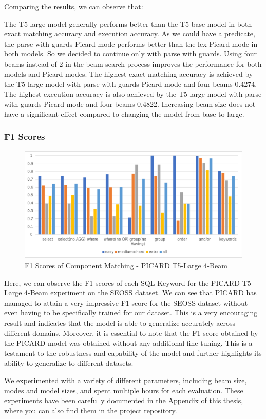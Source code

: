 Comparing the results, we can observe that:

The T5-large model generally performs better than the T5-base model in both exact matching accuracy and execution accuracy.
As we could have a predicate, the parse with guards Picard mode performs better than the lex Picard mode in both models. So we decided to continue only with parse with guards.
Using four beams instead of 2 in the beam search process improves the performance for both models and Picard modes.
The highest exact matching accuracy is achieved by the T5-large model with parse with guards Picard mode and four beams 0.4274.
The highest execution accuracy is also achieved by the T5-large model with parse with guards Picard mode and four beams 0.4822.
Increasing beam size does not have a significant effect compared to changing the model from base to large.
\subsubsection*{F1 Scores}

\begin{figure}[H]
    \centering
    \includegraphics[width=1\textwidth]{pics/ez/F1eps}
    \caption{F1 Scores of Component Matching - PICARD T5-Large 4-Beam}
\end{figure}

Here, we can observe the F1 scores of each SQL Keyword for the PICARD T5-Large 4-Beam experiment on the SEOSS dataset. We can see that PICARD has managed to attain a very impressive F1 score for the SEOSS dataset without even having to be specifically trained for our dataset. This is a very encouraging result and indicates that the model is able to generalize accurately across different domains. Moreover, it is essential to note that the F1 score obtained by the PICARD model was obtained without any additional fine-tuning. This is a testament to the robustness and capability of the model and further highlights its ability to generalize to different datasets.

We experimented with a variety of different parameters, including beam size, modes and model sizes, and spent multiple hours for each evaluation. These experiments have been carefully documented in the Appendix of this thesis, where you can also find them in the project repository.
